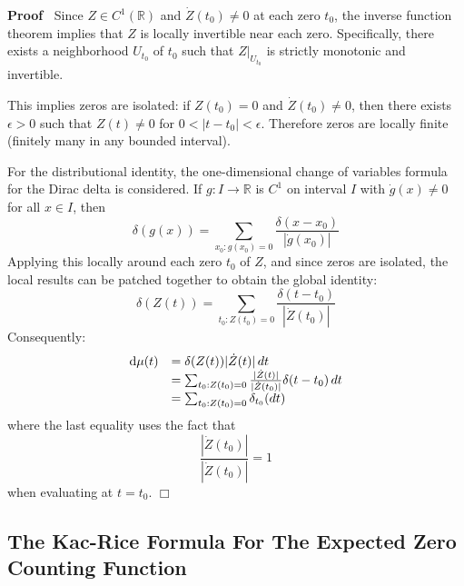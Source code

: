 \documentclass{article}
\newcommand{\mathd}{\mathrm{d}}
\newenvironment{proof}{\noindent\textbf{Proof\ }}{\hspace*{\fill}$\Box$\medskip}
\begin{document}
\begin{proof}
  Since $Z \in C^1 (\mathbb{R})$ and $\dot{Z} (t_0) \neq 0$ at each zero
  $t_0$, the inverse function theorem implies that $Z$ is locally invertible
  near each zero. Specifically, there exists a neighborhood $U_{t_0}$ of $t_0$
  such that $Z|_{U_{t_0}}$ is strictly monotonic and invertible.
  
  This implies zeros are isolated: if $Z (t_0) = 0$ and $\dot{Z} (t_0) \neq
  0$, then there exists $\epsilon > 0$ such that $Z (t) \neq 0$ for $0 < |t -
  t_0 | < \epsilon$. Therefore zeros are locally finite (finitely many in any
  bounded interval).
  
  For the distributional identity, the one-dimensional change of variables
  formula for the Dirac delta is considered. If $g : I \to \mathbb{R}$ is
  $C^1$ on interval $I$ with $\dot{g} (x) \neq 0$ for all $x \in I$, then
  \begin{equation}
    \delta (g (x)) = \sum_{x_0 : g (x_0) = 0} \frac{\delta (x - x_0)}{|
    \dot{g} (x_0) |}
  \end{equation}
  Applying this locally around each zero $t_0$ of $Z$, and since zeros are
  isolated, the local results can be patched together to obtain the global
  identity:
  \begin{equation}
    \delta (Z (t)) = \sum_{t_0 : Z (t_0) = 0} \frac{\delta (t - t_0)}{|
    \dot{Z} (t_0) |}
  \end{equation}
  Consequently:
  \begin{equation}
    \begin{array}{ll}
      \mathd \mu (t) & = \delta (Z (t)) | \dot{Z} (t) |  \hspace{0.17em} dt\\
      & = \sum_{t_0 : Z (t_0) = 0} \frac{| \dot{Z} (t) |}{| \dot{Z} (t_0) |}
      \delta (t - t_0)  \hspace{0.17em} dt\\
      & = \sum_{t_0 : Z (t_0) = 0} \delta_{t_0}  (dt)
    \end{array}
  \end{equation}
  where the last equality uses the fact that
  \begin{equation}
    \frac{| \dot{Z} (t_0) |}{| \dot{Z} (t_0) |} = 1
  \end{equation}
  when evaluating at $t = t_0$.
\end{proof}

\subsection{The Kac-Rice Formula For The Expected Zero Counting Function}
\end{document}
